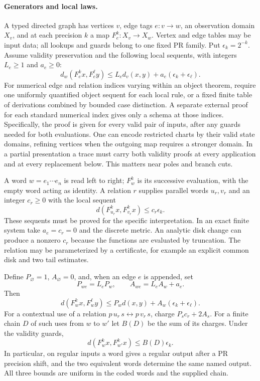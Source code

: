 \paragraph{Generators and local laws.}
A typed directed graph has vertices $v$, edge tags $e:v\to w$, an observation domain $X_v$, and at each precision $k$ a map $F_e^k:X_v\to X_w$. Vertex and edge tables may be input data; all lookups and guards belong to one fixed PR family. Put $\epsilon_k=2^{-k}$. Assume validity preservation and the following local sequents, with integers $L_e\ge1$ and $a_e\ge0$:
\begin{equation}
 d_w(F_e^k x,F_e^\ell y)
 \le L_e d_v(x,y)+a_e(\epsilon_k+\epsilon_\ell).
 \label{eq:edge}
\end{equation}
For numerical edge and relation indices varying within an object theorem, require one uniformly quantified object sequent for each local rule, or a fixed finite table of derivations combined by bounded case distinction. A separate external proof for each standard numerical index gives only a schema at those indices. Specifically, the proof is given for every valid pair of inputs, after any guards needed for both evaluations. One can encode restricted charts by their valid state domains, refining vertices when the outgoing map requires a stronger domain. In a partial presentation a trace must carry both validity proofs at every application and at every replacement below. This matters near poles and branch cuts.

A word $w=e_1\cdots e_n$ is read left to right; $F_w^k$ is its successive evaluation, with the empty word acting as identity. A relation $r$ supplies parallel words $u_r,v_r$ and an integer $c_r\ge0$ with the local sequent
\begin{equation}
 d(F_{u_r}^k x,F_{v_r}^k x)\le c_r\epsilon_k .
 \label{eq:cell}
\end{equation}
These sequents must be proved for the specific interpretation. In an exact finite system take $a_e=c_r=0$ and the discrete metric. An analytic disk change can produce a nonzero $c_r$ because the functions are evaluated by truncation. The relation may be parameterized by a certificate, for example an explicit common disk and two tail estimates.

\begin{theorem}\label{thm:transport}
Define $P_{\varnothing}=1$, $A_{\varnothing}=0$, and, when an edge $e$ is appended, set
\[
 P_{we}=L_eP_w,\qquad A_{we}=L_e A_w+a_e.
\]
Then
\[
 d(F_w^k x,F_w^\ell y)\le P_w d(x,y)+A_w(\epsilon_k+\epsilon_\ell).
\]
For a contextual use of a relation $p\,u_r\,s\leftrightarrow p\,v_r\,s$, charge $P_s c_r+2A_s$. For a finite chain $D$ of such uses from $w$ to $w'$ let $B(D)$ be the sum of its charges. Under the validity guards,
\[
 d(F_w^k x,F_{w'}^k x)\le B(D)\epsilon_k .
\]
In particular, on regular inputs a word gives a regular output after a PR precision shift, and the two equivalent words determine the same named output. All three bounds are uniform in the coded words and the supplied chain.
\end{theorem}


